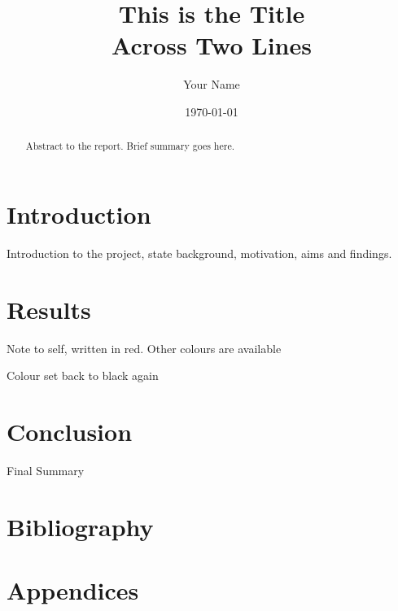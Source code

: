 \documentclass[11pt, A4]{article}
\title{This is the Title\\Across Two Lines}
\author{Your Name}
\date{\today}
\begin{document}
\begin{titlepage}
    \maketitle
    \thispagestyle{empty}
\end{titlepage}

\begin{abstract}
Abstract to the report. Brief summary goes here.
    
\end{abstract}

\newpage
\tableofcontents

\newpage
\section{Introduction}
Introduction to the project, state background, motivation, aims and findings.



\section{Results}
\color{red}Note to self, written in red.
\color{blue}Other colours are available 

\color{black} Colour set back to black again

\section{Conclusion}
Final Summary

\newpage
\section{Bibliography}
\printbibliography

\newpage
\appendix 
\section{Appendices}
\end{document}
